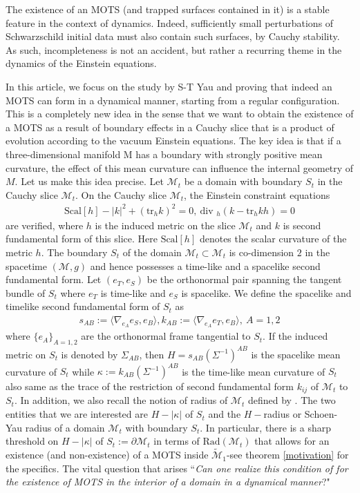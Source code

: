 \documentclass{amsart}
\renewcommand{\div}{\mbox{div }}
\newcommand{\tr}{\mbox{tr}}
\begin{document}
\noindent The existence of an MOTS (and trapped surfaces contained in it) is a stable feature in the context of dynamics. Indeed, sufficiently small perturbations of Schwarzschild initial data must also contain such surfaces, by Cauchy stability. As such, incompleteness is not an accident, but rather a recurring theme in the dynamics of the Einstein equations. 

\vspace{3mm}


\noindent In this article, we focus on the study by S-T Yau \cite{yau} and proving that indeed an MOTS can form in a dynamical manner, starting from a regular configuration. This is a completely new idea in the sense that we want to obtain the existence of a MOTS as a result of boundary effects in a Cauchy slice that is a product of evolution according to the vacuum Einstein equations. The key idea is that if a three-dimensional manifold M has a
boundary with strongly positive mean curvature, the effect of this mean curvature can influence the internal geometry of $M$. Let us make this idea precise. Let $\mathcal{M}_{t}$ be a domain with boundary $S_{t}$ in the Cauchy slice $\mathcal{M}_{t}$. On the Cauchy slice $\mathcal{M}_{t}$, the Einstein constraint equations 
\begin{align}
\text{Scal}[h]-|k|^{2}+(\tr_{h}k)^{2}=0,~
\div_{h}(k-\tr_{h}kh)=0
\end{align}
are verified, where $h$ is the induced metric on the slice $\mathcal{M}_{t}$ and $k$ is second fundamental form of this slice. Here $\text{Scal}[h]$ denotes the scalar curvature of the metric $h$. The boundary $S_{t}$ of the domain $\mathcal{M}_{t}\subset \mathcal{M}_{t}$ is co-dimension $2$ in the spacetime $(\mathcal{M},g)$ and hence possesses a time-like and a spacelike second fundamental form. Let $(e_{T},e_{S})$ be the orthonormal pair spanning the tangent bundle of $S_{t}$ where $e_{T}$ is time-like and $e_{S}$ is spacelike. We define the spacelike and timelike second fundamental form of $S_{t}$ as 
\begin{align}
s_{AB}:=\langle \nabla_{e_{A}}e_{S},e_{B}\rangle, k_{AB}:=\langle \nabla_{e_{A}}e_{T},e_{B}\rangle,~A=1,2    
\end{align}
where $\{e_{A}\}_{A=1,2}$ are the orthonormal frame tangential to $S_{t}$. If the induced metric on $S_{t}$ is denoted by $\Sigma_{AB}$, then $H=s_{AB}(\Sigma^{-1})^{AB}$ is the spacelike mean curvature of $S_{t}$ while $\kappa:=k_{AB}(\Sigma^{-1})^{AB}$ is the time-like mean curvature of $S_{t}$ also same as the trace of the restriction of second fundamental form $k_{ij}$ of $\mathcal{M}_{t}$ to $S_{t}$. In addition, we also recall the notion of radius of $\mathcal{M}_{t}$ defined by \cite{yau}. The two entities that we are interested are $H-|\kappa|$ of $S_{t}$ and the $H-$radius or Schoen-Yau radius of a domain $\mathcal{M}_{t}$ with boundary $S_{t}$. In particular, there is a sharp threshold on $H-|\kappa|$ of $S_{t}:=\partial \mathcal{M}_{t}$ in terms of $\text{Rad}(\mathcal{M}_{t})$ that allows for an existence (and non-existence) of a MOTS inside $\widetilde{\mathcal{M}}_{1}$-see theorem \ref{motivation} for the specifics. The vital question that arises ``\textit{Can one realize this condition of \cite{yau} for the existence of MOTS in the interior of a domain in a dynamical manner}?" 
\end{document}
